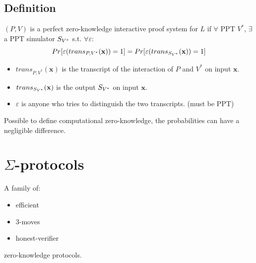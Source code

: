 \documentclass[12pt]{article}
\begin{document}
\subsection{Definition}
$(P,V)$ is a perfect zero-knowledge interactive proof system for $L$ if $\forall$ PPT $V^*$, $\exists$ a PPT simulator $S_{V^*}$ s.t. $\forall \varepsilon$:
\begin{equation*}
Pr[\varepsilon(trans_{P,V^*}(\mathbf{x}))=1] = Pr[\varepsilon(trans_{S_{V^*}}(\mathbf{x}))=1]
\end{equation*}
\begin{itemize}
\item $trans_{P,V^*}(\mathbf{x})$ is the transcript of the interaction of $P$ and $V^*$ on input $\mathbf{x}$.
\item $trans_{S_{V^*}}(\mathbf{x})$ is the output $S_{V^*}$ on input $\mathbf{x}$.
\item $\varepsilon$ is anyone who tries to distinguish the two transcripts. (must be PPT)
\end{itemize}
Possible to define computational zero-knowledge, the probabilities can have a negligible difference.

\section{$\Sigma$-protocols}
A family of:
\begin{itemize}
\item efficient
\item 3-moves
\item honest-verifier
\end{itemize}
zero-knowledge protocols.
\end{document}
